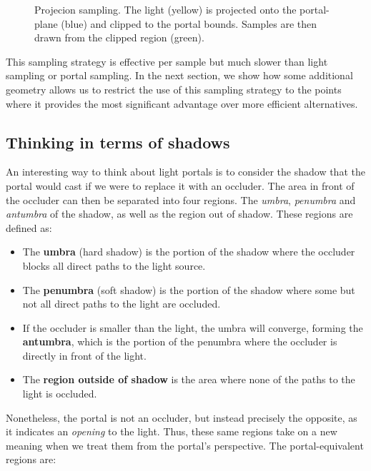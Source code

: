 \begin{figure}[H]
  \centering
  \def\svgwidth{0.6\columnwidth}
  
  \caption{Projecion sampling. The light (yellow) is projected onto the portal-plane (blue) and clipped to the portal bounds. Samples are then drawn from the clipped region (green).}
  \label{fig:projection}
\end{figure} 

This sampling strategy is effective per sample but much slower than light sampling or portal sampling. In the next section, we show how some additional geometry allows us to restrict the use of this sampling strategy to the points where it provides the most significant advantage over more efficient alternatives.

\subsection{Thinking in terms of shadows}
\label{sec:antishadow}

An interesting way to think about light portals is to consider the shadow that the portal would cast if we were to replace it with an occluder. The area in front of the occluder can then be separated into four regions. The \emph{umbra}, \emph{penumbra} and \emph{antumbra} of the shadow, as well as the region out of shadow\cite{hasenfratzSurveyRealtimeSoft2003}. These regions are defined as: 

\begin{itemize}
  \item The \textbf{umbra} (hard shadow) is the portion of the shadow where the occluder blocks all direct paths to the light source.
  \item The \textbf{penumbra} (soft shadow) is the portion of the shadow where some but not all direct paths to the light are occluded.
  \item If the occluder is smaller than the light, the umbra will converge, forming the \textbf{antumbra}, which is the portion of the penumbra where the occluder is directly in front of the light.
  \item The \textbf{region outside of shadow} is the area where none of the paths to the light is occluded.
\end{itemize}

Nonetheless, the portal is not an occluder, but instead precisely the opposite, as it indicates an \emph{opening} to the light. Thus, these same regions take on a new meaning when we treat them from the portal's perspective. The portal-equivalent regions are:

